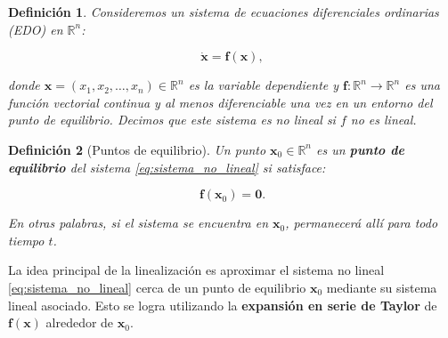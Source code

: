 \documentclass[12pt, a4paper]{report}
\newtheorem{definition}{Definición}
\begin{document}
\begin{definition}
	Consideremos un sistema de ecuaciones diferenciales ordinarias (EDO) en \(\mathbb{R}^n\):

\begin{equation}\label{eq:sistema_no_lineal}
    \dot{\mathbf{x}} = \mathbf{f}(\mathbf{x}),
\end{equation}

donde \(\mathbf{x}=(x_1,x_2,\dots,x_n) \in \mathbb{R}^n\) es la variable dependiente y \(\mathbf{f}: \mathbb{R}^n \to \mathbb{R}^n\) es una función vectorial continua y al menos diferenciable una vez en un entorno del punto de equilibrio. Decimos que este sistema es no lineal si $f$ no es lineal.
\end{definition}

\begin{definition}[Puntos de equilibrio]
	Un punto \(\mathbf{x}_0 \in \mathbb{R}^n\) es un \textbf{punto de equilibrio} del sistema \eqref{eq:sistema_no_lineal} si satisface:

\begin{equation}
    \mathbf{f}(\mathbf{x}_0) = \mathbf{0}.
\end{equation}

En otras palabras, si el sistema se encuentra en \(\mathbf{x}_0\), permanecerá allí para todo tiempo \( t \).
\end{definition}

La idea principal de la linealización es aproximar el sistema no lineal \eqref{eq:sistema_no_lineal} cerca de un punto de equilibrio \(\mathbf{x}_0\) mediante su sistema lineal asociado. Esto se logra utilizando la \textbf{expansión en serie de Taylor} de \(\mathbf{f}(\mathbf{x})\) alrededor de \(\mathbf{x}_0\).
\end{document}
